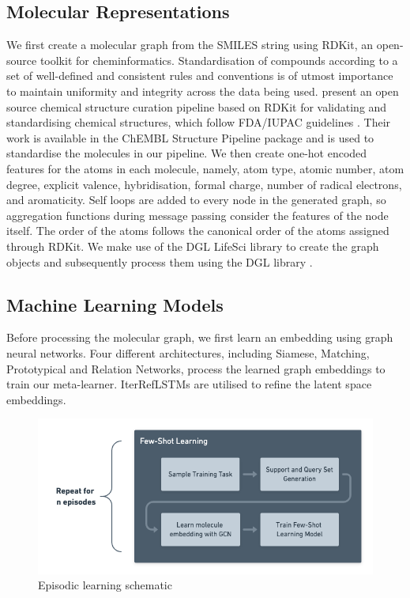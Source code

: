 \documentclass[journal=acscii,manuscript=article]{achemso}
\begin{document}
\subsection{Molecular Representations}

We first create a molecular graph from the SMILES string using RDKit, an open-source toolkit for cheminformatics. Standardisation of compounds according to a set of well-defined and consistent rules and conventions is of utmost importance to maintain uniformity and integrity across the data being used. \citet{bento2020open} present an open source chemical structure curation pipeline based on RDKit for validating and standardising chemical structures, which follow FDA/IUPAC guidelines \citep{brecher2006graphical, food2007substance}. Their work is available in the ChEMBL Structure Pipeline package \cite{bento2020open} and is used to standardise the molecules in our pipeline. We then create one-hot encoded features for the atoms in each molecule, namely, atom type, atomic number, atom degree, explicit valence, hybridisation, formal charge, number of radical electrons, and aromaticity. Self loops are added to every node in the generated graph, so aggregation functions during message passing consider the features of the node itself. The order of the atoms follows the canonical order of the atoms assigned through RDKit. We make use of the DGL LifeSci \cite{dgllife} library to create the graph objects and subsequently process them using the DGL library \cite{wang2019dgl}.


\subsection{Machine Learning Models}

Before processing the molecular graph, we first learn an embedding using graph neural networks. Four different architectures, including Siamese, Matching, Prototypical and Relation Networks, process the learned graph embeddings to train our meta-learner. IterRefLSTMs are utilised to refine the latent space embeddings.
\begin{figure}[h]
  \centering
  \includegraphics[width=0.9\linewidth]{img/episodic-learning.png}
  \caption{Episodic learning schematic}
  \label{fig:episodiclearning}
\end{figure}
\end{document}
